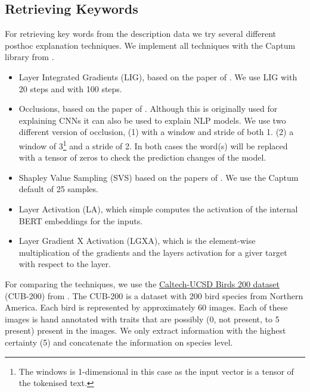 \documentclass[a4paper, 12pt, oneside]{book} %
\begin{document}
\subsection{Retrieving Keywords} \label{par:keywords}
For retrieving key words from the description data we try several different posthoc explanation techniques. We implement all techniques with the Captum library from \textcite{kokhlikyan_captum_2020}.
\begin{itemize}
    \item Layer Integrated Gradients (LIG), based on the paper of \textcite{sundararajan_axiomatic_2017}. We use LIG with 20 steps and with 100 steps.
    \item Occlusions, based on the paper of \textcite{fleet_visualizing_2014}. Although this is originally used for explaining CNNs it can also be used to explain NLP models. We use two different version of occlusion, (1) with a window and stride of both 1. (2) a window of 3\footnote{The windows is 1-dimensional in this case as the input vector is a tensor of the tokenised text.} and a stride of 2. In both cases the word(s) will be replaced with a tensor of zeros to check the prediction changes of the model. 
    \item Shapley Value Sampling (SVS) based on the papers of \textcite{castro_polynomial_2009, strumbelj_efficient_2010}. We use the Captum default of 25 samples.
    \item Layer Activation (LA), which simple computes the activation of the internal BERT embeddings for the inputs.
    \item Layer Gradient X Activation (LGXA), which is the element-wise multiplication of the gradients and the layers activation for a giver target with respect to the layer.
\end{itemize}

For comparing the techniques, we use the \href{http://www.vision.caltech.edu/visipedia/CUB-200-2011.html}{Caltech-UCSD Birds 200 dataset} (CUB-200) from  \textcite{welinder_caltech-ucsd_2010}.
The CUB-200 is a dataset with 200 bird species from Northern America.
Each bird is represented by approximately 60 images. 
Each of these images is hand annotated with traits that are possibly (0, not present, to 5 present) present in the images.
We only extract information with the highest certainty (5) and concatenate the information on species level.
\end{document}
